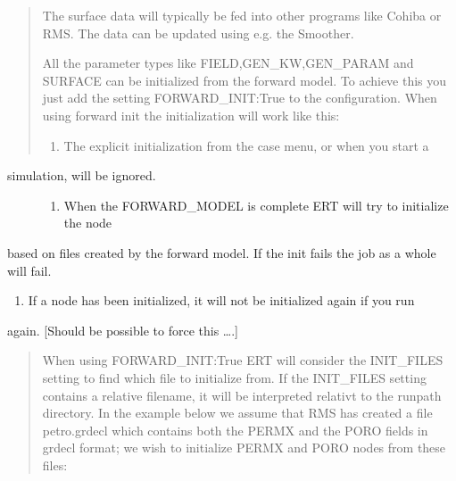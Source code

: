 \documentclass[a4paper,10pt,english]{sphinxmanual}
\begin{document}
\begin{sphinxShadowBox}
\begin{quote}
The surface data will typically be fed into other programs like Cohiba or RMS.
The data can be updated using e.g. the Smoother.


All the parameter types like FIELD,GEN\_KW,GEN\_PARAM and SURFACE can be
initialized from the forward model. To achieve this you just add the setting
FORWARD\_INIT:True to the configuration. When using forward init the
initialization will work like this:
\begin{enumerate}
\item {} 
The explicit initialization from the case menu, or when you start a

\end{enumerate}
\end{quote}
\begin{description}
\item[{simulation, will be ignored.}] \leavevmode\begin{enumerate}
\item {} 
When the FORWARD\_MODEL is complete ERT will try to initialize the node

\end{enumerate}

\end{description}

based on files created by the forward model. If the init fails the job as a
whole will fail.
\begin{enumerate}
\item {} 
If a node has been initialized, it will not be initialized again if you run

\end{enumerate}

again. {[}Should be possible to force this ….{]}
\begin{quote}

When using FORWARD\_INIT:True ERT will consider the INIT\_FILES setting to find
which file to initialize from. If the INIT\_FILES setting contains a relative
filename, it will be interpreted relativt to the runpath directory. In the
example below we assume that RMS has created a file petro.grdecl which
contains both the PERMX and the PORO fields in grdecl format; we wish to
initialize PERMX and PORO nodes from these files:

%
\begin{sphinxVerbatim}[commandchars=\\\{\}]
                
              
\end{sphinxVerbatim}


\end{quote}
\end{sphinxShadowBox}
\end{document}
